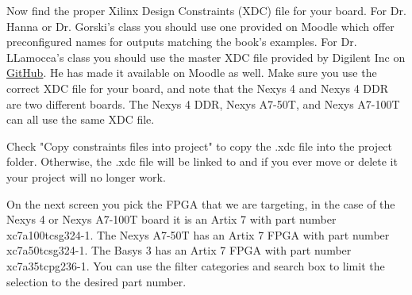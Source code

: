 Now find the proper Xilinx Design Constraints (XDC) file for your board.
For Dr. Hanna or Dr. Gorski's class you should use one provided on Moodle which offer
preconfigured names for outputs matching the book's examples.
For Dr. LLamocca's class you should use the master XDC file provided by Digilent Inc on
\href{https://github.com/Digilent/digilent-xdc}{GitHub}.
He has made it available on Moodle as well.
Make sure you use the correct XDC file for your board, and note that the Nexys 4 and Nexys 4 DDR
are two different boards.
The Nexys 4 DDR, Nexys A7-50T, and Nexys A7-100T can all use the same XDC file.

Check "Copy constraints files into project" to copy the .xdc file into the project folder.
Otherwise, the .xdc file will be linked to and if you ever move or delete it your project
will no longer work.

\begin{center}
\end{center}

On the next screen you pick the FPGA that we are targeting, in the case of the Nexys 4 or
Nexys A7-100T board it is an Artix 7 with part number xc7a100tcsg324-1.
The Nexys A7-50T has an Artix 7 FPGA with part number xc7a50tcsg324-1.
The Basys 3 has an Artix 7 FPGA with part number xc7a35tcpg236-1.
You can use the filter categories and search box to limit the selection to the desired part number.

